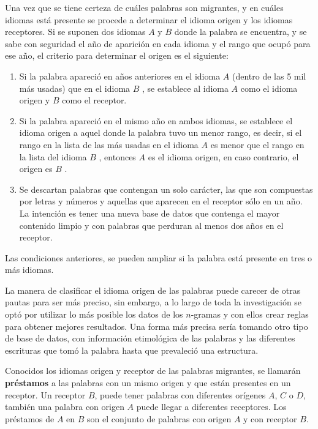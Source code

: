 Una vez que se tiene certeza de cuáles palabras son migrantes, y en cuáles
idiomas está presente se procede a determinar el idioma origen y los idiomas
receptores.   Si se suponen dos idiomas $\textit{A}$ y $\textit{B}$  donde la
palabra se encuentra, y se sabe con seguridad el año de aparición en cada
idioma y el rango que ocupó para ese año,  el criterio para determinar el
origen es el siguiente: 
\begin{enumerate}
\item  Si la palabra apareció en años anteriores en el idioma $\textit{A}$
(dentro de las 5 mil más usadas) que en el idioma $\textit{B}$ , se establece
al idioma $\textit{A}$  como el idioma origen y $\textit{B}$  como el receptor.
\item Si la palabra apareció en el mismo año en ambos idiomas, se establece el
idioma origen a aquel donde la palabra tuvo un menor rango, es decir, si el
rango en la lista de las más usadas en el idioma $\textit{A}$  es menor que el
rango en la lista del idioma $\textit{B}$ , entonces $\textit{A}$  es el idioma
origen, en caso contrario, el origen es $\textit{B}$ .
\item Se descartan palabras que contengan un solo carácter, las que son
compuestas por letras y números y aquellas que aparecen en el receptor sólo en un año. La intención es tener una  nueva base de datos que contenga el mayor contenido
limpio y con palabras que perduran al menos dos años en el receptor.

\end{enumerate}
Las condiciones anteriores, se pueden ampliar si la palabra está presente en tres o más idiomas.

La manera de clasificar el idioma origen de las palabras puede carecer de otras
pautas para ser más preciso, sin embargo, a lo largo de toda la investigación
se optó por utilizar lo más posible los datos de los $n$-gramas y  con ellos
crear reglas para obtener mejores resultados.  Una forma más precisa sería tomando otro
tipo de base de datos, con información etimológica de las palabras y las
diferentes escrituras que tomó la palabra hasta que prevaleció una estructura.  

Conocidos los idiomas origen y receptor de las palabras migrantes, se llamarán
\textbf{préstamos} a las palabras con un mismo origen y que están  presentes en
un receptor.  Un receptor $\textit{B}$, puede tener palabras con diferentes
orígenes $\textit{A}$, $\textit{C}$ o $\textit{D}$, también una palabra con
origen $\textit{A}$ puede llegar a diferentes receptores.  Los préstamos de
$\textit{A}$  en $\textit{B}$  son el conjunto de palabras con origen
$\textit{A}$  y con receptor $\textit{B}$.     



